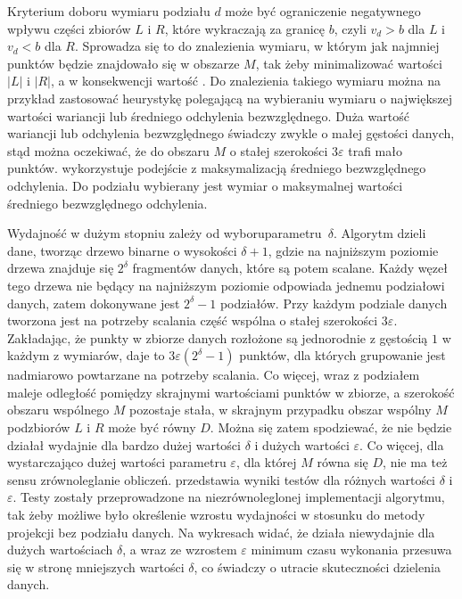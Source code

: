 Kryterium doboru wymiaru podziału $ d $ może być ograniczenie negatywnego wpływu części zbiorów $ L $ i $ R $, które wykraczają za granicę $ b $, czyli $ v_d > b $ dla $ L $ i $ v_d < b $ dla $ R $. Sprowadza się to do znalezienia wymiaru, w którym jak najmniej punktów będzie znajdowało się w obszarze $ M $, tak żeby minimalizować wartości $ |L| $ i $ |R| $, a w konsekwencji wartość . Do znalezienia takiego wymiaru można na przykład zastosować heurystykę polegającą na wybieraniu wymiaru o największej wartości wariancji lub średniego odchylenia bezwzględnego. Duża wartość wariancji lub odchylenia bezwzględnego świadczy zwykle o małej gęstości danych, stąd można oczekiwać, że do obszaru $ M $ o stałej szerokości $ 3\varepsilon $ trafi mało punktów.  wykorzystuje podejście z maksymalizacją średniego bezwzględnego odchylenia. Do podziału wybierany jest wymiar o maksymalnej wartości średniego bezwzględnego odchylenia.


Wydajność  w dużym stopniu zależy od wyboru\linebreak \mbox{parametru $ \delta $}. Algorytm dzieli dane, tworząc drzewo binarne o wysokości $ \delta + 1 $, gdzie na najniższym poziomie drzewa znajduje się $ 2^\delta $ fragmentów danych, które są potem scalane. Każdy węzeł tego drzewa nie będący na najniższym poziomie odpowiada jednemu podziałowi danych, zatem dokonywane jest $ 2^\delta - 1 $ podziałów. Przy każdym podziale danych tworzona jest na potrzeby scalania część wspólna o stałej szerokości $ 3\varepsilon $. Zakładając, że punkty w zbiorze danych rozłożone są jednorodnie z gęstością $ 1 $ w każdym z wymiarów, daje to $ 3\varepsilon(2^\delta - 1) $ punktów, dla których grupowanie jest nadmiarowo powtarzane na potrzeby scalania. Co więcej, wraz z podziałem maleje odległość pomiędzy skrajnymi wartościami punktów w zbiorze, a szerokość obszaru wspólnego $ M $ pozostaje stała, w skrajnym przypadku obszar wspólny $ M $ podzbiorów $ L $ i $ R $ może być równy $ D $. Można się zatem spodziewać, że  nie będzie działał wydajnie dla bardzo dużej wartości $ \delta $ i dużych wartości $ \varepsilon $. Co więcej, dla wystarczająco dużej wartości parametru $ \varepsilon $, dla której $ M $ równa się $ D $, nie ma też sensu zrównoleglanie obliczeń.  przedstawia wyniki testów  dla różnych wartości $ \delta $ i $ \varepsilon $. Testy zostały przeprowadzone na niezrównoleglonej implementacji algorytmu, tak żeby możliwe było określenie wzrostu wydajności w stosunku do metody projekcji bez podziału danych. Na wykresach widać, że  działa niewydajnie dla dużych wartościach $ \delta $, a wraz ze wzrostem $ \varepsilon $ minimum czasu wykonania przesuwa się w stronę mniejszych wartości $ \delta $, co świadczy o utracie skuteczności dzielenia danych.


